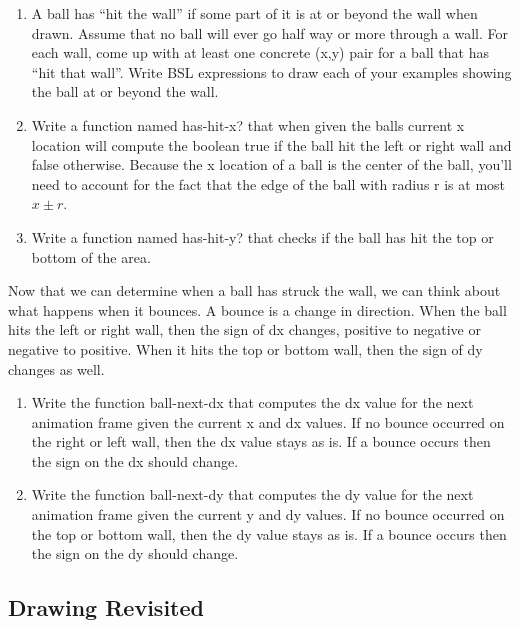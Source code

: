 \documentclass[nobib]{tufte-handout}
\begin{document}
\begin{enumerate}[resume]
  \item A ball has ``hit the wall'' if some part of it is at or beyond the wall when drawn. Assume that no ball will ever go half way or more through a wall. For each wall, come up with at least one concrete (x,y) pair for a ball that has ``hit that wall''.  Write BSL expressions to draw each of your examples showing the ball at or beyond the wall.

  \item Write a function named has-hit-x? that when given the balls current x location will compute the boolean true if the ball hit the left or right wall and false otherwise. Because the x location of a ball is the center of the ball, you'll need to account for the fact that the edge of the ball with radius r is at most $x \pm r$.

  \item Write a function named has-hit-y? that checks if the ball has hit the top or bottom of the area.
\end{enumerate}

Now that we can determine when a ball has struck the wall, we can think about what happens when it bounces. A bounce is a change in direction. When the ball hits the left or right wall, then the sign of dx changes, positive to negative or negative to positive. When it hits the top or bottom wall, then the sign of dy changes as well.

\begin{enumerate}[resume]
  \item Write the function ball-next-dx that computes the dx value for the next animation frame given the current x and dx values. If no bounce occurred on the right or left wall, then the dx value stays as is. If a bounce occurs then the sign on the dx should change.

  \item Write the function ball-next-dy that computes the dy value for the next animation frame given the current y and dy values.  If no bounce occurred on the top or bottom wall, then the dy value stays as is. If a bounce occurs then the sign on the dy should change.
\end{enumerate}

\subsection*{Drawing Revisited}
\end{document}
